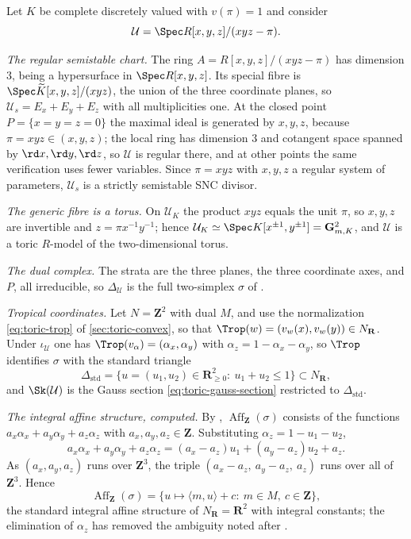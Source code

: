 \begin{example}
\label{ex:toric-triangle-chart}
Let $K$ be complete discretely valued with $v(\pi)=1$ and consider
\[
 \mathcal U=\Spec R[x,y,z]/(xyz-\pi).
\]

\emph{The regular semistable chart.}
The ring $A=R[x,y,z]/(xyz-\pi)$ has dimension $3$, being a hypersurface
in $\Spec R[x,y,z]$. Its special fibre is
$\Spec\widetilde K[x,y,z]/(xyz)$, the union of the three coordinate
planes, so $\mathcal U_s=E_x+E_y+E_z$ with all multiplicities one. At the
closed point $P=\{x=y=z=0\}$ the maximal ideal is generated by
$x,y,z$, because $\pi=xyz\in(x,y,z)$; the local ring has dimension
$3$ and cotangent space spanned by $\rd x,\rd y,\rd z$, so
$\mathcal U$ is regular there, and at other points the same verification
uses fewer variables. Since $\pi=xyz$ with $x,y,z$ a regular system of
parameters, $\mathcal U_s$ is a strictly semistable SNC divisor.

\emph{The generic fibre is a torus.} On
$\mathcal U_K$ the product $xyz$ equals the unit $\pi$, so $x,y,z$
are invertible and $z=\pi x^{-1}y^{-1}$; hence
$\mathcal U_K\simeq\Spec K[x^{\pm1},y^{\pm1}]=\mathbf G_{m,K}^2$, and
$\mathcal U$ is a toric $R$-model of the two-dimensional torus.

\emph{The dual complex.} The strata are the three planes, the three
coordinate axes, and $P$, all irreducible, so $\Delta_{\mathcal U}$ is
the full two-simplex $\sigma$ of .

\emph{Tropical coordinates.} Let $N=\mathbf Z^2$ with dual $M$, and use
the normalization \eqref{eq:toric-trop} of
\cref{sec:toric-convex}, so that $\Trop(w)=(v_w(x),v_w(y))\in
N_{\mathbf R}$. Under $\iota_{\mathcal U}$ one has
$\Trop(v_\alpha)=(\alpha_x,\alpha_y)$ with
$\alpha_z=1-\alpha_x-\alpha_y$, so $\Trop$ identifies $\sigma$ with
the standard triangle
\[
 \Delta_{\mathrm{std}}
 =\{u=(u_1,u_2)\in\mathbf R_{\ge0}^2:\ u_1+u_2\le1\}
 \subset N_{\mathbf R},
\]
and $\Sk(\mathcal U)$ is the Gauss section
\eqref{eq:toric-gauss-section} restricted to $\Delta_{\mathrm{std}}$.

\emph{The integral affine structure, computed.} By
, $\operatorname{Aff}_{\mathbf Z}(\sigma)$ consists of the
functions $a_x\alpha_x+a_y\alpha_y+a_z\alpha_z$ with
$a_x,a_y,a_z\in\mathbf Z$. Substituting $\alpha_z=1-u_1-u_2$,
\[
 a_x\alpha_x+a_y\alpha_y+a_z\alpha_z
 =(a_x-a_z)u_1+(a_y-a_z)u_2+a_z .
\]
As $(a_x,a_y,a_z)$ runs over $\mathbf Z^3$, the triple
$(a_x-a_z,\ a_y-a_z,\ a_z)$ runs over all of $\mathbf Z^3$. Hence
\[
 \operatorname{Aff}_{\mathbf Z}(\sigma)
 =\{u\longmapsto\langle m,u\rangle+c:\ m\in M,\ c\in\mathbf Z\},
\]
the standard integral affine structure of $N_{\mathbf R}=\mathbf R^2$
with integral constants; the elimination of $\alpha_z$ has removed the
ambiguity noted after .


\end{example}
